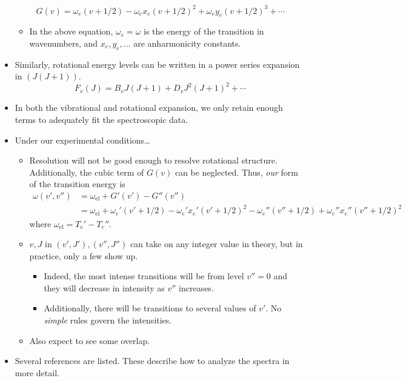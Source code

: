 \documentclass[../notes.tex]{subfiles}
\begin{document}
\begin{itemize}
\begin{equation*}
        G(v) = \omega_e(v+1/2)-\omega_ex_e(v+1/2)^2+\omega_ey_e(v+1/2)^3+\cdots
    \end{equation*}
    \begin{itemize}
        \item In the above equation, $\omega_e=\omega$ is the energy of the transition in wavenumbers, and $x_e,y_e,\dots$ are anharmonicity constants.
    \end{itemize}
    \item Similarly, rotational energy levels can be written in a power series expansion in $(J(J+1))$.
    \begin{equation*}
        F_v(J) = B_vJ(J+1)+D_vJ^2(J+1)^2+\cdots
    \end{equation*}
    \item In both the vibrational and rotational expansion, we only retain enough terms to adequately fit the spectroscopic data.
    \item Under our experimental conditions\dots
    \begin{itemize}
        \item Resolution will not be good enough to resolve rotational structure. Additionally, the cubic term of $G(v)$ can be neglected. Thus, \emph{our} form of the transition energy is
        \begin{align*}
            \omega(v',v'') &= \omega_\text{el}+G'(v')-G''(v'')\\
            &= \omega_\text{el}+\omega_e'(v'+1/2)-\omega_e'x_e'(v'+1/2)^2-\omega_e''(v''+1/2)+\omega_e''x_e''(v''+1/2)^2
        \end{align*}
        where $\omega_\text{el}=T_e'-T_e''$.
        \item $v,J$ in $(v',J'),(v'',J'')$ can take on any integer value in theory, but in practice, only a few show up.
        \begin{itemize}
            \item Indeed, the most intense transitions will be from level $v''=0$ and they will decrease in intensity as $v''$ increases.
            \item Additionally, there will be transitions to several values of $v'$. No \emph{simple} rules govern the intensities.
        \end{itemize}
        \item Also expect to see some overlap.
    \end{itemize}
    \item Several references are listed. These describe how to analyze the spectra in more detail.

\end{itemize}
\end{document}
